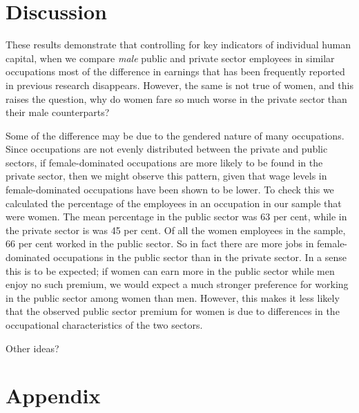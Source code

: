 \documentclass[a4paper,11pt,titlepage]{article}
\begin{document}
\section{Discussion}
These results demonstrate that controlling for key indicators of individual human capital, when we compare \emph{male} public and private sector employees in similar occupations most of the difference in earnings that has been frequently reported in previous research disappears.  However, the same is not true of women, and this raises the question, why do women fare so much worse in the private sector than their male counterparts?

Some of the difference may be due to the gendered nature of many occupations.  Since occupations are not evenly distributed between the private and public sectors, if female-dominated occupations are more likely to be found in the private sector, then we might observe this pattern, given that wage levels in female-dominated occupations have been shown to be lower.  To check this we calculated the percentage of the employees in an occupation in our sample that were women.  The mean percentage in the public sector was 63 per cent, while in the private sector is was 45 per cent. Of all the women employees in the sample, 66 per cent worked in the public sector.  So in fact there are more jobs in female-dominated occupations in the public sector than in the private sector.  In a sense this is to be expected; if women can earn more in the public sector while men enjoy no such premium, we would expect a much stronger preference for working in the public sector among women than men.  However, this makes it less likely that the observed public sector premium for women is due to differences in the occupational characteristics of the two sectors.

\begin{db}
Other ideas?
\end{db}

\clearpage
\appendix
\section{Appendix}
\end{document}
